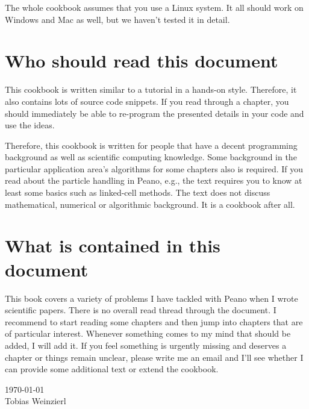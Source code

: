 The whole cookbook assumes that you use a Linux system. It all should work on
Windows and Mac as well, but we haven't tested it in detail.


\section*{Who should read this document}

This cookbook is written similar to a tutorial in a hands-on style.
Therefore, it also contains lots of source code snippets.
If you read through a chapter, you should immediately be able to re-program the
presented details in your code and use the ideas.

Therefore, this cookbook is written for people that have a decent programming
background as well as scientific computing knowledge.
Some background in the particular application area's algorithms for some
chapters also is required. 
If you read about the particle handling in Peano, e.g., the text requires you to
know at least some basics such as linked-cell methods.
The text does not discuss mathematical, numerical or algorithmic background.
It is a cookbook after all.


\section*{What is contained in this document}

This book covers a variety of problems I have tackled with Peano when I wrote
scientific papers.
There is no overall read thread through the document.
I recommend to start reading some chapters and then jump into chapters
that are of particular interest.
Whenever something comes to my mind that should be added, I will add it.
If you feel something is urgently missing and deserves a chapter or things
remain unclear, please write me an email and I'll see whether I can provide some
additional text or extend the cookbook.


{
  \flushright
  \today 
  \\ 
  Tobias Weinzierl 
  \\
}

 